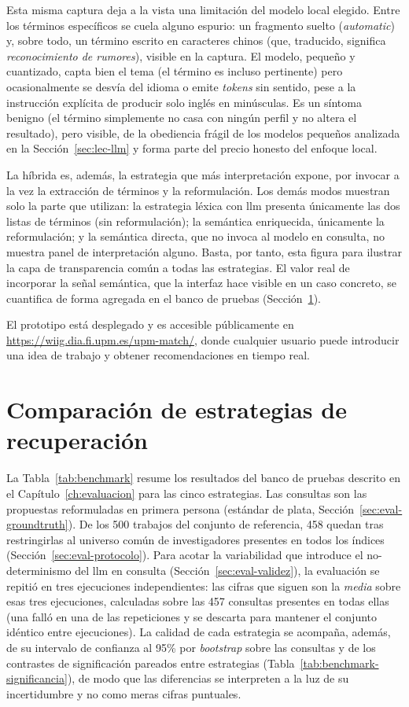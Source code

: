 Esta misma captura deja a la vista una limitación del modelo local elegido.
Entre los términos específicos se cuela alguno espurio: un fragmento suelto (\emph{automatic}) y, sobre todo, un término escrito en caracteres chinos (que, traducido, significa \emph{reconocimiento de rumores}), visible en la captura.
El modelo, pequeño y cuantizado, capta bien el tema (el término es incluso pertinente) pero ocasionalmente se desvía del idioma o emite \emph{tokens} sin sentido, pese a la instrucción explícita de producir solo inglés en minúsculas.
Es un síntoma benigno (el término simplemente no casa con ningún perfil y no altera el resultado), pero visible, de la obediencia frágil de los modelos pequeños analizada en la Sección~\ref{sec:lec-llm} y forma parte del precio honesto del enfoque local.

La híbrida es, además, la estrategia que más interpretación expone, por invocar a la vez la extracción de términos y la reformulación.
Los demás modos muestran solo la parte que utilizan: la estrategia léxica con \gls{llm} presenta únicamente las dos listas de términos (sin reformulación); la semántica enriquecida, únicamente la reformulación; y la semántica directa, que no invoca al modelo en consulta, no muestra panel de interpretación alguno.
Basta, por tanto, esta figura para ilustrar la capa de transparencia común a todas las estrategias.
El valor real de incorporar la señal semántica, que la interfaz hace visible en un caso concreto, se cuantifica de forma agregada en el banco de pruebas (Sección~\ref{sec:res-benchmark}).

El prototipo está desplegado y es accesible públicamente en \url{https://wiig.dia.fi.upm.es/upm-match/}, donde cualquier usuario puede introducir una idea de trabajo y obtener recomendaciones en tiempo real.

\section{Comparación de estrategias de recuperación}
\label{sec:res-benchmark}

La Tabla~\ref{tab:benchmark} resume los resultados del banco de pruebas descrito en el Capítulo~\ref{ch:evaluacion} para las cinco estrategias.
Las consultas son las propuestas reformuladas en primera persona (estándar de plata, Sección~\ref{sec:eval-groundtruth}).
De los 500 trabajos del conjunto de referencia, 458 quedan tras restringirlas al universo común de investigadores presentes en todos los índices (Sección~\ref{sec:eval-protocolo}).
Para acotar la variabilidad que introduce el no-determinismo del \gls{llm} en consulta (Sección~\ref{sec:eval-validez}), la evaluación se repitió en tres ejecuciones independientes: las cifras que siguen son la \emph{media} sobre esas tres ejecuciones, calculadas sobre las 457 consultas presentes en todas ellas (una falló en una de las repeticiones y se descarta para mantener el conjunto idéntico entre ejecuciones).
La calidad de cada estrategia se acompaña, además, de su intervalo de confianza al 95\% por \emph{bootstrap} sobre las consultas y de los contrastes de significación pareados entre estrategias (Tabla~\ref{tab:benchmark-significancia}), de modo que las diferencias se interpreten a la luz de su incertidumbre y no como meras cifras puntuales.

